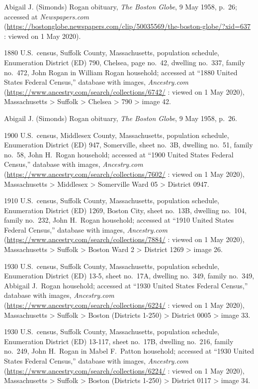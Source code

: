 \begin{thebibliography}{999}
Abigail J. (Simonds) Rogan obituary, \textit{The Boston Globe}, 9 May 1958, p.\ 26; accessed at \textit{Newspapers.com} (\url{https://bostonglobe.newspapers.com/clip/50035569/the-boston-globe/?xid=637} : viewed on 1 May 2020).

1880 U.S.\ census, Suffolk County, Massachusetts, population schedule, Enumeration District (ED) 790, Chelsea, page no.\ 42, dwelling no.\ 337, family no.\ 472, John Rogan in William Rogan household; accessed at ``1880 United States Federal Census,'' database with images, \textit{Ancestry.com} (\url{https://www.ancestry.com/search/collections/6742/} : viewed on 1 May 2020), Massachusetts > Suffolk > Chelsea > 790 > image 42.

Abigail J. (Simonds) Rogan obituary, \textit{The Boston Globe}, 9 May 1958, p.\ 26.

1900 U.S.\ census, Middlesex County, Massachusetts, population schedule, Enumeration District (ED) 947, Somerville, sheet no.\ 3B, dwelling no.\ 51, family no.\ 58, John H.\ Rogan household; accessed at ``1900 United States Federal Census,'' database with images, \textit{Ancestry.com} (\url{https://www.ancestry.com/search/collections/7602/} : viewed on 1 May 2020), Massachusetts > Middlesex > Somerville Ward 05 > District 0947.

1910 U.S.\ census, Suffolk County, Massachusetts, population schedule, Enumeration District (ED) 1269, Boston City, sheet no.\ 13B, dwelling no.\ 104, family no.\ 232, John H.\ Rogan household; accessed at ``1910 United States Federal Census,'' database with images, \textit{Ancestry.com} (\url{https://www.ancestry.com/search/collections/7884/} : viewed on 1 May 2020), Massachusetts > Suffolk > Boston Ward 2 > District 1269 > image 26.

1930 U.S.\ census, Suffolk County, Massachusetts, population schedule, Enumeration District (ED) 13-5, sheet no.\ 17A, dwelling no.\ 349, family no.\ 349, Abbigail J.\ Rogan household; accessed at ``1930 United States Federal Census,'' database with images, \textit{Ancestry.com} (\url{https://www.ancestry.com/search/collections/6224/} : viewed on 1 May 2020), Massachusetts > Suffolk > Boston (Districts 1-250) > District 0005 > image 33.

1930 U.S.\ census, Suffolk County, Massachusetts, population schedule, Enumeration District (ED) 13-117, sheet no.\ 17B, dwelling no.\ 216, family no.\ 249, John H.\ Rogan in Mabel F.\ Patton household; accessed at ``1930 United States Federal Census,'' database with images, \textit{Ancestry.com} (\url{https://www.ancestry.com/search/collections/6224/} : viewed on 1 May 2020), Massachusetts > Suffolk > Boston (Districts 1-250) > District 0117 > image 34.


\end{thebibliography}
